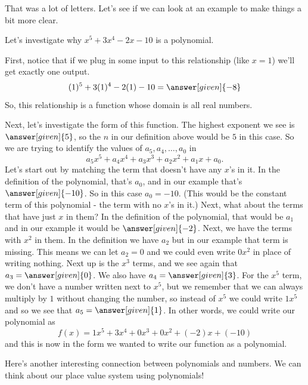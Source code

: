 \documentclass{ximera}
\begin{document}
That was a lot of letters. Let's see if we can look at an example to make things a bit more clear.
\begin{example}
Let's investigate why $x^5 + 3x^4 -2x-10$ is a polynomial.

First, notice that if we plug in some input to this relationship (like $x=1$) we'll get exactly one output.
\[
(1)^5 + 3(1)^4 - 2(1)-10 = \answer[given]{-8}
\]
So, this relationship is a function whose domain is all real numbers. 

Next, let's investigate the form of this function. The highest exponent we see is $\answer[given]{5}$, so the $n$ in our definition above would be $5$ in this case. So we are trying to identify the values of $a_5, a_4, \dots, a_0$ in
\[
a_5x^5 + a_4 x^4 + a_3x^3 + a_2x^2 + a_1x+a_0.
\]
Let's start out by matching the term that doesn't have any $x$'s in it. In the definition of the polynomial, that's $a_0$, and in our example that's $\answer[given]{-10}$. So in this case $a_0 = -10$. (This would be the constant term of this polynomial - the term with no $x$'s in it.) Next, what about the terms that have just $x$ in them? In the definition of the polynomial, that would be $a_1$ and in our example it would be $\answer[given]{-2}$. Next, we have the terms with $x^2$ in them. In the definition we have $a_2$ but in our example that term is missing. This means we can let $a_2 = 0$ and we could even write $0x^2$ in place of writing nothing. Next up is the $x^3$ terms, and we see again that $a_3 = \answer[given]{0}$. We also have $a_4 = \answer[given]{3}$. For the $x^5$ term, we don't have a number written next to $x^5$, but we remember that we can always multiply by $1$ without changing the number, so instead of $x^5$ we could write $1x^5$ and so we see that $a_5 = \answer[given]{1}$. In other words, we could write our polynomial as 
\[
f(x) = 1x^5 + 3x^4 + 0x^3 + 0x^2 + (-2)x + (-10)
\]
and this is now in the form we wanted to write our function as a polynomial.
\end{example}
Here's another interesting connection between polynomials and numbers. We can think about our place value system using polynomials!
\end{document}
